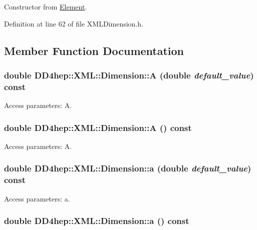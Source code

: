 Constructor from \hyperlink{class_d_d4hep_1_1_x_m_l_1_1_element}{Element}. 

Definition at line 62 of file XMLDimension.h.

\subsection{Member Function Documentation}
\hypertarget{struct_d_d4hep_1_1_x_m_l_1_1_dimension_a04be03f345e521bcfa7544ae99cfbd16}{
\subsubsection[{A}]{\setlength{\rightskip}{0pt plus 5cm}double DD4hep::XML::Dimension::A (double {\em default\_\-value}) const}}
\label{struct_d_d4hep_1_1_x_m_l_1_1_dimension_a04be03f345e521bcfa7544ae99cfbd16}


Access parameters: A. \hypertarget{struct_d_d4hep_1_1_x_m_l_1_1_dimension_ad10c68417be42bec5d4c873a17c2f328}{
\subsubsection[{A}]{\setlength{\rightskip}{0pt plus 5cm}double DD4hep::XML::Dimension::A () const}}
\label{struct_d_d4hep_1_1_x_m_l_1_1_dimension_ad10c68417be42bec5d4c873a17c2f328}


Access parameters: A. \hypertarget{struct_d_d4hep_1_1_x_m_l_1_1_dimension_a7684282299d47d6ef22c8d3b19f0e335}{
\subsubsection[{a}]{\setlength{\rightskip}{0pt plus 5cm}double DD4hep::XML::Dimension::a (double {\em default\_\-value}) const}}
\label{struct_d_d4hep_1_1_x_m_l_1_1_dimension_a7684282299d47d6ef22c8d3b19f0e335}


Access parameters: a. \hypertarget{struct_d_d4hep_1_1_x_m_l_1_1_dimension_a28e671ab611d1eb8f19bc9476938be8f}{
\subsubsection[{a}]{\setlength{\rightskip}{0pt plus 5cm}double DD4hep::XML::Dimension::a () const}}
\label{struct_d_d4hep_1_1_x_m_l_1_1_dimension_a28e671ab611d1eb8f19bc9476938be8f}


